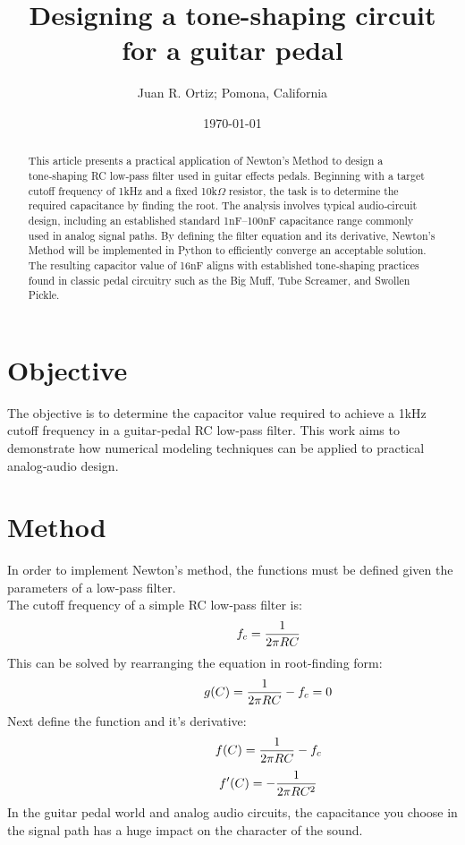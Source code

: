 \documentclass[letterpaper,twocolumn,fleqn]{article}
\title{ Designing a tone-shaping circuit for a guitar pedal }
\author{ Juan R. Ortiz; Pomona, California}
\date{\today} %
\begin{document}
 
\maketitle 
\thispagestyle{empty} %


\begin{abstract}
This article presents a practical application of Newton’s Method to design a tone‑shaping RC low‑pass filter used in guitar effects pedals. Beginning with a target cutoff frequency of 1kHz and a fixed 10k$\Omega$ resistor, the task is to determine the required capacitance by finding the root. The analysis involves typical audio‑circuit design, including an established standard 1nF–100nF capacitance range commonly used in analog signal paths. By defining the filter equation and its derivative, Newton’s Method will be implemented in Python to efficiently converge an acceptable solution. The resulting capacitor value of 16nF aligns with established tone‑shaping practices found in classic pedal circuitry such as the Big Muff, Tube Screamer, and Swollen Pickle.
\end{abstract}

\section{Objective}
\label{sec:intro}
The objective is to determine the capacitor value required to achieve a 1kHz cutoff frequency in a guitar‑pedal RC low‑pass filter. This work aims to demonstrate how numerical modeling techniques can be applied to practical analog‑audio design.

\section{Method}
In order to implement Newton's method, the functions must be defined given the parameters of a low-pass filter.
\vspace{0.1in}
\\The cutoff frequency of a simple RC low‑pass filter is:
\[\hspace{0.8in}
f_c = \frac{1}{2\pi RC}
\]
\vspace{0.05in}
This can be solved by rearranging the equation in root-finding form:
\[\hspace{0.8in}
g(C) = \frac{1}{2\pi RC} - f_c = 0
\]
\vspace{0.05in}
Next define the function and it's derivative:
\vspace{0.1in}
\[\hspace{0.8in}
f(C) = \frac{1}{2\pi RC} - f_c
\]
\[\hspace{0.8in}
f'(C) = -\frac{1}{2\pi RC^2}
\]
In the guitar pedal world and analog audio circuits, the capacitance
you choose in the signal path has a huge impact on the character of
the sound.
\end{document}
